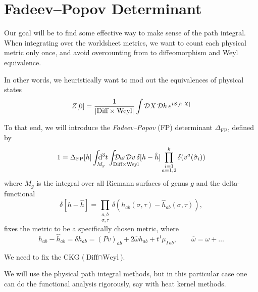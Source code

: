 
\section{Fadeev--Popov Determinant}%
\label{sec:fadeev_popov_determinant}

Our goal will be to find some effective way to make sense of the path integral. When integrating over the worldsheet metrics, we want to count each physical metric only once, and avoid overcounting from to diffeomorphism and Weyl equivalence.

In other words, we heuristically want to mod out the equivalences of physical states
\begin{equation}
  \label{eq:9-1}
  Z[0] = \frac{1}{\abs{\text{Diff} \times \text{Weyl}}} \int \mathop{\mathcal{D} X} \mathop{\mathcal{D} h} e^{i S[h, X]}
\end{equation}
\begin{definition}
  To that end, we will introduce the \emph{Fadeev--Popov} (FP) determinant $\Delta_{\text{FP}}$, defined by
  \begin{equation}
    \label{eq:9-2}
    1 = \Delta_{\text{FP}}[h] \int_{\mathrlap{M_g}} \dd[3]{t} \int_{\mathrlap{\text{Diff} \times \text{Weyl}}} \pdd{\omega} \pdd{v} \delta[h - \hat{h}] \prod_{\substack{i = 1 \\ a = 1, 2}}^k \delta(v^a (\hat{\sigma}_i))
  \end{equation}
  where $M_g$ is the integral over all Riemann surfaces of genus $g$ and the delta-functional
  \begin{equation}
    \delta[h - \hat{h}] = \prod_{\substack{a, b\\ \sigma, \tau}} \delta(h_{ab}(\sigma, \tau) - \hat{h}_{ab}(\sigma, \tau)),
  \end{equation}
  fixes the metric to be a specifically chosen metric, where
  \begin{equation}
    h_{ab} - \hat{h}_{ab} = \delta h_{ab} = (Pv)_{ab} + 2 \overline{\omega}{} h_{ab} + t^I \mu_{I\,ab}, \qquad \overline{\omega}{} = \omega + \dots
  \end{equation}
\end{definition}
We need to fix the CKG ($\text{Diff} \cap \text{Weyl}$).

\begin{leftbar}
  We will use the physical path integral methods, but in this particular case one can do the functional analysis rigorously, say with heat kernel methods.
\end{leftbar}

